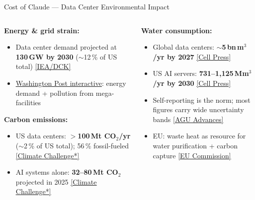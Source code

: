 \documentclass[xcolor,aspectratio=169,compress]{beamer}
\newcommand{\lnk}[2]{\href{#1}{\underline{#2}}}
\begin{document}
\begin{frame}[shrink=5]{Cost of Claude --- Data Center Environmental Impact}
  \small
  \begin{columns}[t]
    \begin{column}{.48\textwidth}
      \textbf{Energy \& grid strain:}
      \begin{itemize}\setlength{\itemsep}{2pt}
        \item Data center demand projected at \textbf{130\,GW by 2030} ($\sim$12\,\% of US total)
              \lnk{https://www.datacenterknowledge.com/energy-power-supply/world-energy-outlook-2025-skyrocketing-data-center-demand-outpaces-grid}{[IEA/DCK]}
        \item\lnk{https://www.washingtonpost.com/climate-environment/interactive/2025/giant-data-centers-energy-pollution/}{Washington Post interactive}: energy demand + pollution from mega-facilities
      \end{itemize}

      \medskip
      \textbf{Carbon emissions:}
      \begin{itemize}\setlength{\itemsep}{2pt}
        \item US data centers: \textbf{$>$100\,Mt CO$_2$/yr} ($\sim$2\,\% of US total); 56\,\% fossil-fueled
              \lnk{https://www.climatechallange.com/environmental-impact-of-u-s-data-centers-2025-facts-and-figures/}{[Climate Challenge*]}
        \item AI systems alone: \textbf{32--80\,Mt CO$_2$} projected in 2025
              \lnk{https://www.climatechallange.com/environmental-impact-of-u-s-data-centers-2025-facts-and-figures/}{[Climate Challenge*]}
      \end{itemize}
    \end{column}
    \begin{column}{.48\textwidth}
      \textbf{Water consumption:}
      \begin{itemize}\setlength{\itemsep}{2pt}
        \item Global data centers: \textbf{$\sim$5\,bn\,m$^3$/yr by 2027}
              \lnk{https://www.sciencedirect.com/science/article/pii/S2666389925002788}{[Cell Press]}
        \item US AI servers: \textbf{731--1,125\,Mm$^3$/yr by 2030}
              \lnk{https://www.sciencedirect.com/science/article/pii/S2666389925002788}{[Cell Press]}
        \item Self-reporting is the norm; most figures carry wide uncertainty bands
              \lnk{https://agupubs.onlinelibrary.wiley.com/doi/10.1029/2025AV002140}{[AGU Advances]}
        \item EU: waste heat as resource for water purification + carbon capture
              \lnk{https://environment.ec.europa.eu/news/ai-data-centre-waste-heat-could-be-used-water-purification-and-carbon-capture-2026-03-30_en}{[EU Commission]}
      \end{itemize}


\end{column}
\end{columns}
\end{frame}
\end{document}
